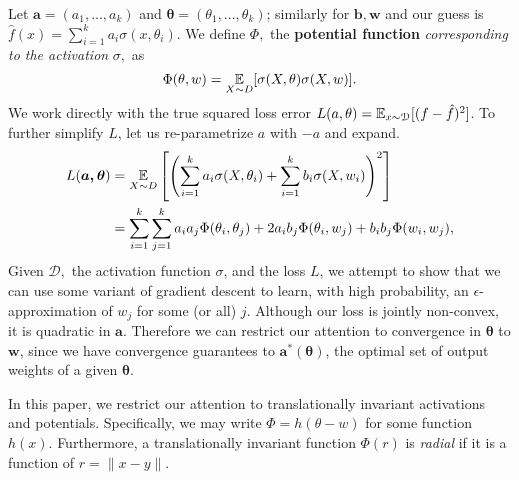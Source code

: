 Let $\boldsymbol{a} = (a_1,...,a_k)$ and $\boldsymbol{\theta} =
(\theta_1,...,\theta_k)$; similarly for $\boldsymbol{b},
\boldsymbol{w}$ and our guess is $\hat{f}(x) = \sum_{i=1}^k a_i
\sigma(x, \theta_i)$. 
We define $\Phi,$ the {\bf potential function} {\it corresponding to the activation
  } $\sigma,$ as
\[\Phi(\theta, w) = \operatorname*{\mathbb{E}}_{X\sim D}[ \sigma(X,\theta) \sigma(X,w)].\]
%
We work directly with the true squared loss error $L(a,\theta)= \operatorname*{\mathbb{E}}_{x \sim \mathcal{D}}[(f - \hat{f})^2]$. To further simplify $L$, let us
re-parametrize $a$ with $-a$ and expand.
%
%
\begin{align}
 L(\boldsymbol{a,\theta})  & = \expt_{X\sim D}\left[ \left(
  \sum_{i=1}^k a_i \sigma(X,\theta_i) + \sum_{i=1}^k
  b_i\sigma(X,w_i)\right)^2\right] \nonumber \\
%
& = \sum_{i=1}^k \sum_{j=1}^k a_i a_j \Phi(\theta_i,\theta_j)+ 2 a_ib_j \Phi(\theta_i,w_j)+ b_i b_j \Phi(w_i,w_j),
 \label{errLoss}
\end{align}
%
Given $\mathcal{D},$ the activation function $\sigma$, and the loss $L$, we attempt to show that we can use some variant of gradient descent to learn, with high probability, an $\epsilon$-approximation of $w_j$ for some (or all) $j$. Although our loss is jointly non-convex, it is quadratic in $\boldsymbol{a}$. Therefore we can restrict our attention to convergence in $\boldsymbol{\theta}$ to $\boldsymbol{w}$, since we have convergence guarantees to $\boldsymbol{a^*(\theta)}$, the optimal set of output weights of a given $\boldsymbol{\theta}$. 








In this paper, we restrict our attention to translationally invariant activations
and potentials.
%
Specifically, we may write $\Phi= h(\theta-w)$ for some function $h(x).$ Furthermore, a translationally invariant function $\Phi(r)$ is {\it radial} if it is a function of $r = \|x - y \|$.

